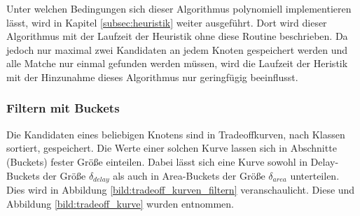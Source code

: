 \documentclass[11pt, a4paper, german]{article}
\begin{document}
Unter welchen Bedingungen sich dieser Algorithmus polynomiell implementieren lässt, wird in Kapitel \ref{subsec:heuristik} weiter ausgeführt. Dort wird dieser Algorithmus mit der Laufzeit der Heuristik ohne diese Routine beschrieben. Da jedoch nur maximal zwei Kandidaten an jedem Knoten gespeichert werden und alle Matche nur einmal gefunden werden müssen, wird die Laufzeit der Heristik mit der Hinzunahme dieses Algorithmus nur geringfügig beeinflusst.

\subsubsection{Filtern mit Buckets}
\label{subsubsec:filtern}
Die Kandidaten eines beliebigen Knotens sind in Tradeoffkurven, nach Klassen sortiert, gespeichert. Die Werte einer solchen Kurve lassen sich in Abschnitte (Buckets) fester Größe einteilen. Dabei lässt sich eine Kurve sowohl in Delay-Buckets  der Größe $\delta_{delay}$ als auch in Area-Buckets der Größe $\delta_{area}$ unterteilen. Dies wird in Abbildung \ref{bild:tradeoff_kurven_filtern} veranschaulicht. Diese und Abbildung \ref{bild:tradeoff_kurve} wurden \cite{Elbert} entnommen. \\
\end{document}
